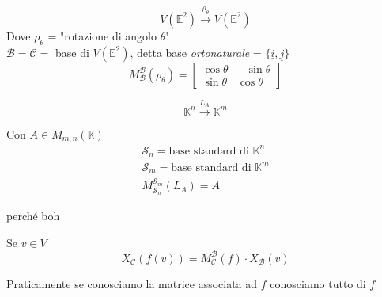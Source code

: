 \begin{esempio}
    \begin{equation}
        V(\mathbb{E}^2)\xrightarrow{\rho_{\theta}} V(\mathbb{E}^2)
    \end{equation}
    Dove $\rho_{\theta}$ = "rotazione di angolo $\theta$" \\
    $\mathscr{B} = \mathscr{C} = $ base di $V(\mathbb{E}^2)$, detta base \textit{ortonaturale} = $\{\underline{i}, \underline{j}\}$
    \begin{equation}
        M_{\mathscr{B}}^{\mathscr{B}}(\rho_\theta) = \begin{bmatrix}
            \cos\theta & -\sin\theta \\
            \sin\theta & \cos\theta
        \end{bmatrix}
    \end{equation}
\end{esempio}

\begin{esempio}
    \begin{equation}
        \mathbb{K}^n \xrightarrow{L_A} \mathbb{K}^m
    \end{equation}

    Con $A\in M_{m,n}(\mathbb{K})$ \\
    \begin{gather}
        \mathcal{S}_n= \text{base standard di } \mathbb{K}^n \\
        \mathcal{S}_m= \text{base standard di } \mathbb{K}^m \\
        M_{\mathcal{S}_n}^{\mathcal{S}_m}(L_A)=A
    \end{gather}

    perché boh
\end{esempio}

\begin{proposizione}
    Se $v\in V$
    \begin{equation}
        X_{\mathscr{C}}(f(v))= M_{\mathscr{C}}^{\mathscr{B}}(f)\cdot X_{\mathscr{B}}(v)
    \end{equation}

    Praticamente se conosciamo la matrice associata ad $f$ conosciamo tutto di $f$
\end{proposizione}

